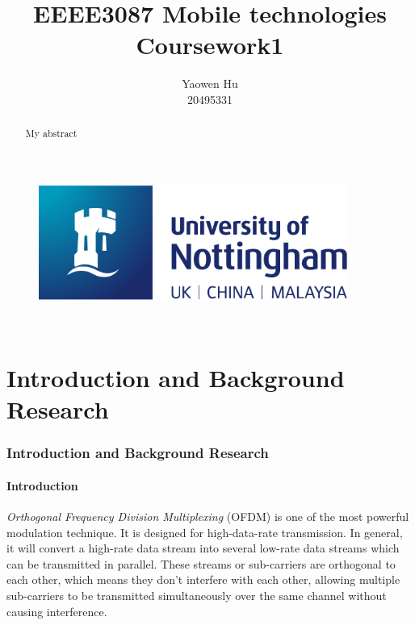 \documentclass{article}
\title{EEEE3087 Mobile technologies \\Coursework1}
\author{Yaowen Hu\\20495331}
\begin{document}

\begin{titlepage}
\begin{figure}
    \vspace{-4em}
    \centering
    \includegraphics[width=0.9\textwidth]{images/logo.png}
\end{figure}

\vfill
\maketitle
\vfill

\\
\centering{\today}
\thispagestyle{empty}
\pagebreak
\end{titlepage}


\tableofcontents
\thispagestyle{empty}
\pagebreak


\begin{abstract}
My abstract
\thispagestyle{empty}
\pagebreak
\end{abstract}


\part{Introduction and Background Research}

\section{Introduction and Background Research}

\pagestyle{plain}
\setcounter{page}{1}

\subsection{Introduction}
\textit{Orthogonal Frequency Division Multiplexing} (OFDM) is one of the most powerful modulation technique. It is designed for high-data-rate transmission. In general, it will convert a high-rate data stream into several low-rate data streams which can be transmitted in parallel\cite{RN79}. These streams or sub-carriers are orthogonal to each other, which means they don't interfere with each other, allowing multiple sub-carriers to be transmitted simultaneously over the same channel without causing interference.
\end{document}
